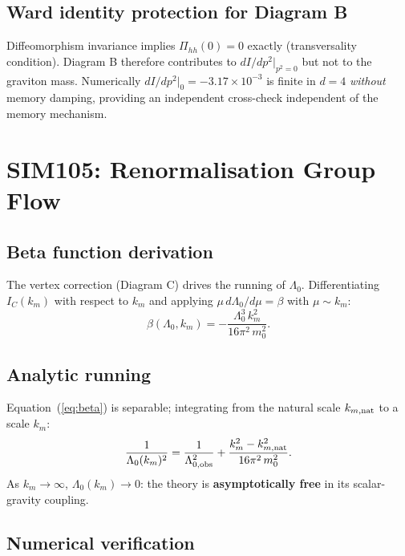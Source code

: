 \documentclass[12pt,a4paper]{article}
\begin{document}
\subsection{Ward identity protection for Diagram B}

Diffeomorphism invariance implies $\Pi_{hh}(0)=0$ exactly
(transversality condition).  Diagram B therefore contributes to
$dI/dp^2|_{p^2=0}$ but not to the graviton mass.  Numerically
$dI/dp^2|_0 = -3.17\times10^{-3}$ is finite in $d=4$ \emph{without}
memory damping, providing an independent cross-check independent of the
memory mechanism.

\section{SIM105: Renormalisation Group Flow}
\label{sec:sim105}

\subsection{Beta function derivation}

The vertex correction (Diagram C) drives the running of $\Lambda_0$.
Differentiating $I_C(k_m)$ with respect to $k_m$ and applying
$\mu\,d\Lambda_0/d\mu = \beta$ with $\mu\sim k_m$:
\begin{equation}
\beta(\Lambda_0,k_m)
= -\frac{\Lambda_0^3\,k_m^2}{16\pi^2\,m_0^2}.
\label{eq:beta}
\end{equation}

\subsection{Analytic running}

Equation~(\ref{eq:beta}) is separable; integrating from the natural
scale $k_{m,\rm nat}$ to a scale $k_m$:
\begin{equation}
\frac{1}{\Lambda_0(k_m)^2}
= \frac{1}{\Lambda_{0,\rm obs}^2}
  + \frac{k_m^2 - k_{m,\rm nat}^2}{16\pi^2\,m_0^2}.
\label{eq:running}
\end{equation}
As $k_m\to\infty$, $\Lambda_0(k_m)\to0$: the theory is
\textbf{asymptotically free} in its scalar-gravity coupling.

\subsection{Numerical verification}
\end{document}
